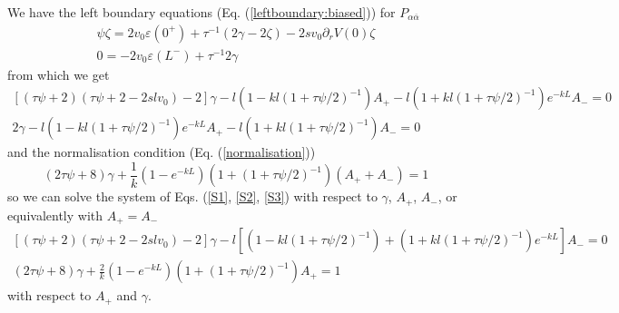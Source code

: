 \documentclass[pre,aps,superscriptaddress,nofootinbib]{revtex4}
\begin{document}
We have the left boundary equations (Eq. (\ref{leftboundary:biased})) for $P_{\alpha\overline{\alpha}}$
\begin{eqnarray}
\label{LBe1}
\psi \zeta = 2 v_0 \varepsilon(0^+) + \tau^{-1} (2 \gamma - 2 \zeta) - 2 s v_0 \partial_r V(0) \zeta\\
\label{LBe2}
0 = - 2 v_0 \varepsilon(L^-) + \tau^{-1} 2 \gamma
\end{eqnarray}
from which we get
\begin{eqnarray}
\label{S1}
\left[(\tau\psi + 2)(\tau\psi + 2 - 2 s l v_0) - 2\right] \gamma - l \left(1 - kl  (1 + \tau\psi/2)^{-1}\right) A_+ - l \left(1 + kl(1 + \tau\psi/2)^{-1}\right) e^{-kL} A_- = 0\\
\label{S2}
2 \gamma - l \left(1 - kl (1 + \tau\psi/2)^{-1}\right) e^{-kL} A_+ - l \left(1 + kl (1 + \tau\psi/2)^{-1}\right) A_- = 0
\end{eqnarray}
and the normalisation condition (Eq. (\ref{normalisation}))
\begin{equation}
(2 \tau \psi + 8) \gamma + \frac{1}{k} (1 - e^{-kL})(1 + (1 + \tau\psi/2)^{-1})(A_+ + A_-) = 1
\label{S3}
\end{equation}
so we can solve the system of Eqs. (\ref{S1}, \ref{S2}, \ref{S3}) with respect to $\gamma$, $A_+$, $A_-$, or equivalently with $A_+ = A_-$
\begin{eqnarray}
\label{S01}
\left[(\tau\psi + 2)(\tau\psi + 2 - 2 s l v_0) - 2\right] \gamma - l \left[\left(1 - kl  (1 + \tau\psi/2)^{-1}\right) + \left(1 + kl(1 + \tau\psi/2)^{-1}\right) e^{-kL}\right] A_- = 0\\
\label{S02}
(2 \tau \psi + 8) \gamma + \frac{2}{k} (1 - e^{-kL})(1 + (1 + \tau\psi/2)^{-1}) A_+ = 1
\end{eqnarray}
with respect to $A_+$ and $\gamma$.\\
\end{document}
